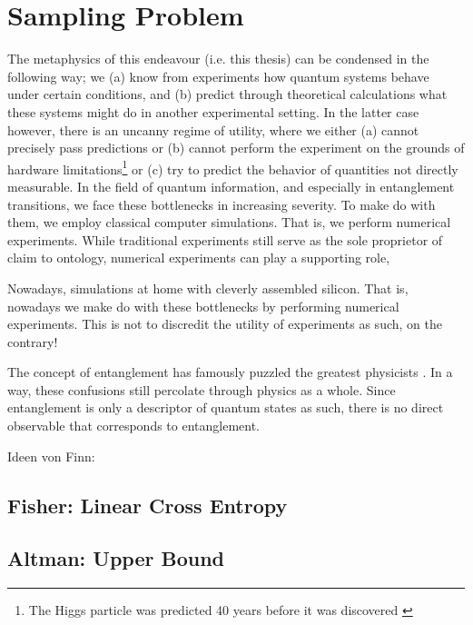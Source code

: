 \section{Sampling Problem}\label{sec:sampling}

The metaphysics of this endeavour (i.e. this thesis) can be condensed in the
following way; we (a) know from experiments how quantum systems behave under
certain conditions, and (b) predict through theoretical calculations what these
systems might do in another experimental setting. In the latter case however,
there is an uncanny regime of utility, where we either (a) cannot precisely
pass predictions or (b) cannot perform the experiment on the grounds of
hardware limitations\footnote{The Higgs particle was predicted 40 years before
it was discovered \cite{nobelprize.orgNobelPrizePhysics2013}} or (c) try to
predict the behavior of quantities not directly measurable. In the field of
quantum information, and especially in entanglement transitions, we face these
bottlenecks in increasing severity. To make do with them, we employ classical
computer simulations. That is, we perform numerical experiments. While
traditional experiments still serve as the sole proprietor of claim to
ontology, numerical experiments can play a supporting role, 

Nowadays, 
simulations at home with cleverly assembled silicon.  That is, nowadays we make
do with these bottlenecks by performing numerical experiments. This is not to
discredit the utility of experiments as such, on the contrary! 

The concept of entanglement has famously
puzzled the greatest physicists
\cite{schroedingerGegenwaertigeSituationQuantenmechanik1935,einsteinCanQuantumMechanicalDescription1935}.
In a way, these confusions still percolate through physics as a whole. 
Since
entanglement is only a descriptor of quantum states as such, there is no direct
observable that corresponds to entanglement. 

Ideen von Finn: \cite{joshiObservingQuantumMpemba2024,aresEntanglementAsymmetryProbe2023}

\subsection{Fisher: Linear Cross Entropy}
\cite{liCrossEntropyBenchmark2023}

\subsection{Altman: Upper Bound}
\cite{garrattProbingPostmeasurementEntanglement2023}


